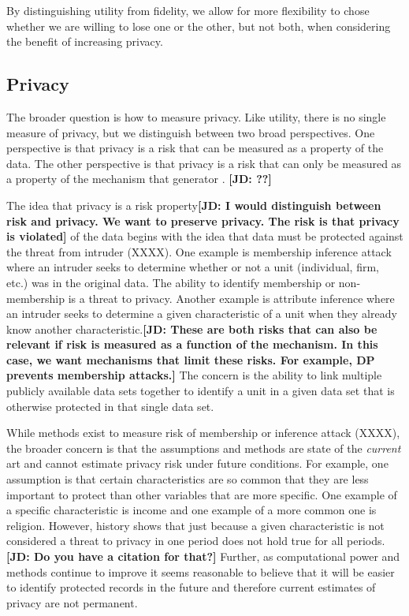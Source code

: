 \documentclass[runningheads]{llncs}
\newcommand{\jd}[1]{\scriptsize {\bf \color{red}[JD: #1]}\normalsize}
\begin{document}
By distinguishing utility from fidelity, we allow for more flexibility to chose whether we are willing to lose one or the other, but not both, when considering the benefit of increasing privacy.

\subsection{Privacy}

The broader question is how to measure privacy.  Like utility, there is no single measure of privacy, but we distinguish between two broad perspectives.  One perspective is that privacy is a risk that can be measured as a property of the data.  The other perspective is that privacy is a risk that can only be measured as a property of the mechanism that generator \cite[pg. 2]{jordon2022synthetic}. \jd{??} 

The idea that privacy is a risk property\jd{I would distinguish between risk and privacy. We want to preserve privacy. The risk is that privacy is violated} of the data begins with the idea that data must be protected against the threat from intruder (XXXX).  One example is membership inference attack where an intruder seeks to determine whether or not a unit (individual, firm, etc.) was in the original data.  The ability to identify membership or non-membership is a threat to privacy.  Another example is attribute inference where an intruder seeks to determine a given characteristic of a unit when they already know another characteristic.\jd{These are both risks that can also be relevant if risk is measured as a function of the mechanism. In this case, we want mechanisms that limit these risks. For example, DP prevents membership attacks.}  The concern is the ability to link multiple publicly available data sets together to identify a unit in a given data set that is otherwise protected in that single data set.  

While methods exist to measure risk of membership or inference attack (XXXX), the broader concern is that the assumptions and methods are state of the \emph{current} art and cannot estimate privacy risk under future conditions.  For example, one assumption is that certain characteristics are so common that they are less important to protect than other variables that are more specific.  One example of a specific characteristic is income and one example of a more common one is religion.  However, history shows that just because a given characteristic is not considered a threat to privacy in one period does not hold true for all periods.\jd{Do you have a citation for that?}  Further, as computational power and methods continue to improve it seems reasonable to believe that it will be easier to identify protected records in the future and therefore current estimates of privacy are not permanent.
\end{document}
